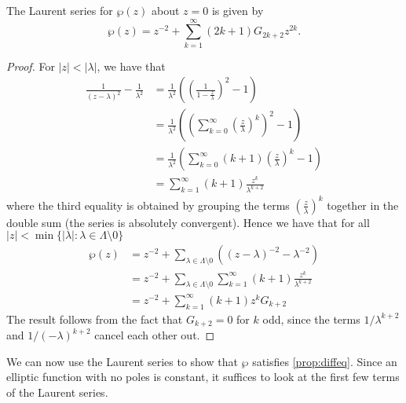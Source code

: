 \begin{proposition}
	\label{prop:laurent}
	The Laurent series for $\wp(z)$ about $z = 0$ is given by
	\begin{equation*}
		\wp(z) = z^{-2} + \sum_{k = 1}^\infty (2k + 1)G_{2k + 2}z^{2k}.
	\end{equation*}
\end{proposition}
\begin{proof}
	For $|z| < |\lambda|$, we have that
	\begin{align*}
		\frac{1}{(z - \lambda)^2} - \frac{1}{\lambda^{2}}
		&= \frac{1}{\lambda^2}\left(\left(\frac{1}{1 - \frac{z}{\lambda}}
			\right)^2 - 1\right)\\
		&= \frac{1}{\lambda^2}\left(\left(
		\sum_{k = 0}^{\infty}\left(\frac{z}{\lambda}\right)^k\right)^2 -
		1 \right)\\	
		&= \frac{1}{\lambda^2}\left(
		\sum_{k = 0}^\infty(k + 1)\left(\frac{z}{\lambda}\right)^k - 1\right)\\
		&= \sum_{k = 1}^\infty (k + 1)\frac{z^k}{\lambda^{k+ 2}}
	\end{align*}
	where the third equality is obtained by grouping the terms
	$\left(\frac{z}{\lambda}\right)^k$ together in the double sum 
	(the series is absolutely convergent). Hence we have that
	for all $|z| < \min\{|\lambda|: \lambda \in \Lambda\setminus 0\}$
	\begin{align*}
		\wp(z) &= z^{-2} + \sum_{\lambda\in \Lambda \setminus 0}
		\left((z - \lambda)^{-2} - \lambda^{-2}\right)\\
		&= z^{-2} + \sum_{\lambda\in \Lambda\setminus 0}
		\sum_{k = 1}^\infty(k + 1)\frac{z^k}{\lambda^{k + 2}}\\
		&= z^{-2} + \sum_{k = 1}^{\infty}(k + 1)z^k G_{k + 2}
	\end{align*}
	The result follows from the fact that $G_{k + 2} = 0$ for $k$ odd, since
	the terms $1/\lambda^{k + 2}$ and $1/(-\lambda)^{k + 2}$ cancel each other
	out.
\end{proof}

We can now use the Laurent series to show that $\wp$ satisfies
\ref{prop:diffeq}.
Since an elliptic function with no poles is constant, it suffices to look
at the first few terms of the Laurent series.

